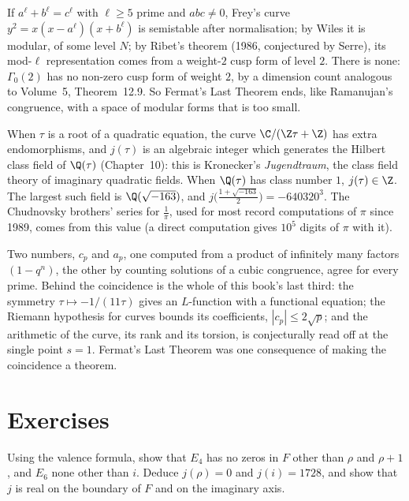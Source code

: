 \begin{remark}[Fermat]
If $a^\ell+b^\ell=c^\ell$ with $\ell\ge5$ prime and $abc\ne0$, Frey's curve $y^2=x(x-a^\ell)(x+b^\ell)$ is semistable after normalisation; by Wiles it is modular, of some level $N$;
by Ribet's theorem (1986, conjectured by Serre), its mod-$\ell$ representation comes from a weight-$2$ cusp form of level $2$. There is none: $\Gamma_0(2)$ has no non-zero cusp
form of weight $2$, by a dimension count analogous to Volume~5, Theorem~12.9. So Fermat's Last Theorem ends, like Ramanujan's congruence, with a space of modular forms
that is too small.
\end{remark}

\begin{remark}\label{rem:cm}
When $\tau$ is a root of a quadratic equation, the curve $\C/(\Z\tau+\Z)$ has extra endomorphisms, and $j(\tau)$ is an algebraic integer which generates the Hilbert
class field of $\Q(\tau)$ (Chapter~10): this is Kronecker's \emph{Jugendtraum}, the class field theory of imaginary quadratic fields. When $\Q(\tau)$ has class number $1$,
$j(\tau)\in\Z$. The largest such field is $\Q(\sqrt{-163})$, and $j\bigl(\frac{1+\sqrt{-163}}2\bigr)=-640320^3$. The Chudnovsky brothers' series for $\frac1\pi$, used for
most record computations of $\pi$ since 1989, comes from this value (a direct computation gives $10^5$ digits of $\pi$ with it).
\end{remark}

\begin{beauty}
Two numbers, $c_p$ and $a_p$, one computed from a product of infinitely many factors $(1-q^n)$, the other by counting solutions of a cubic congruence, agree for every
prime. Behind the coincidence is the whole of this book's last third: the symmetry $\tau\mapsto-1/(11\tau)$ gives an $L$-function with a functional equation; the Riemann
hypothesis for curves bounds its coefficients, $|c_p|\le2\sqrt p$; and the arithmetic of the curve, its rank and its torsion, is conjecturally read off at the single point
$s=1$. Fermat's Last Theorem was one consequence of making the coincidence a theorem.
\end{beauty}

\section{Exercises}

\begin{exercise}[$\star$]\label{ex:jvalues}
Using the valence formula, show that $E_4$ has no zeros in $F$ other than $\rho$ and $\rho+1$, and $E_6$ none other than $i$. Deduce $j(\rho)=0$ and $j(i)=1728$, and show
that $j$ is real on the boundary of $F$ and on the imaginary axis.
\end{exercise}


